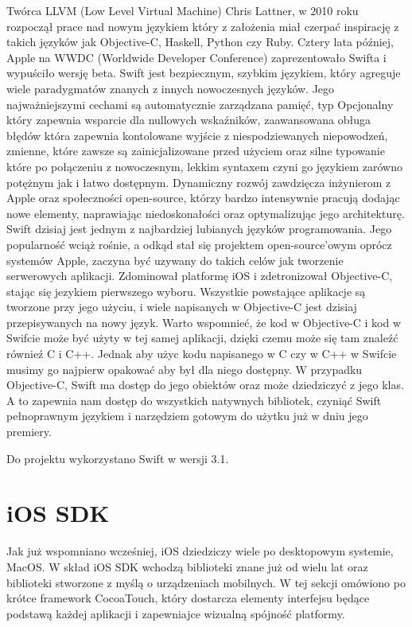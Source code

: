 Twórca LLVM (Low Level Virtual Machine) Chris Lattner, w 2010 roku rozpoczął prace nad nowym językiem który z założenia miał czerpać inspirację z takich języków jak Objective-C, Haskell, Python czy Ruby. Cztery lata później, Apple na WWDC (Worldwide Developer Conference) zaprezentowało Swifta i wypuściło wersję beta. Swift jest bezpiecznym, szybkim językiem, który agreguje wiele paradygmatów znanych z innych nowoczesnych języków. Jego najważniejszymi cechami są automatycznie zarządzana pamięć, typ Opcjonalny który zapewnia wsparcie dla nullowych wskaźników, zaawansowana obługa błędów która zapewnia kontolowane wyjście z niespodziewanych niepowodzeń, zmienne, które zawsze są zainicjalizowane przed użyciem oraz silne typowanie które po połączeniu z nowoczesnym, lekkim syntaxem czyni go językiem zarówno potężnym jak i łatwo dostępnym. Dynamiczny rozwój zawdzięcza inżynierom z Apple oraz społeczności open-source, którzy bardzo intensywnie pracują dodając nowe elementy, naprawiając niedoskonałości oraz optymalizując jego architekturę. Swift dzisiaj jest jednym z najbardziej lubianych języków programowania. Jego popularność wciąż rośnie, a odkąd stał się projektem open-source'owym oprócz systemów Apple, zaczyna być uzywany do takich celów jak tworzenie serwerowych aplikacji. Zdominował platformę iOS i zdetronizował Objective-C, stając się jezykiem pierwszego wyboru. Wszystkie powstające aplikacje są tworzone przy jego użyciu, i wiele napisanych w Objective-C jest dzisiaj przepisywanych na nowy język. Warto wspomnieć, że kod w Objective-C i kod w Swifcie może być użyty w tej samej aplikacji, dzięki czemu może się tam znaleźć równieź C i C++. Jednak aby użyc kodu napisanego w C czy w C++ w Swifcie musimy go najpierw opakować aby był dla niego dostępny. W przypadku Objective-C, Swift ma dostęp do jego obiektów oraz może dziedziczyć z jego klas. A to zapewnia nam dostęp do wszystkich natywnych bibliotek, czyniąć Swift pełnoprawnym językiem i narzędziem gotowym do użytku już w dniu jego premiery.

Do projektu wykorzystano Swift w wersji 3.1.

\section{iOS SDK}

Jak już wspomniano wcześniej, iOS dziedziczy wiele po desktopowym systemie, MacOS. W skład iOS SDK wchodzą biblioteki znane już od wielu lat oraz biblioteki stworzone z myślą o urządzeniach mobilnych. W tej sekcji omówiono po krótce framework CocoaTouch, który dostarcza elementy interfejsu będące podstawą każdej aplikacji i zapewniajce wizualną spójność platformy.

